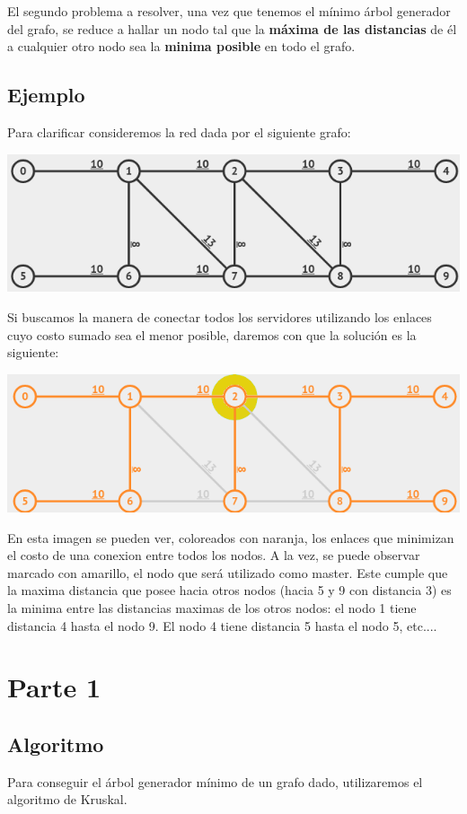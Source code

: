 \documentclass[a4paper]{report}
\begin{document}
El segundo problema a resolver, una vez que tenemos el mínimo árbol generador del grafo, se reduce a hallar un nodo tal que la \textbf{máxima de las distancias} de él a cualquier otro nodo sea la \textbf{minima posible} en todo el grafo.

\subsection{Ejemplo}

Para clarificar consideremos la red dada por el siguiente grafo:

\includegraphics[width=\textwidth]{grafo.png}

Si buscamos la manera de conectar todos los servidores utilizando los enlaces cuyo costo sumado sea el menor posible, daremos con que la solución es la siguiente:

\includegraphics[width=\textwidth]{mst.png}

En esta imagen se pueden ver, coloreados con naranja, los enlaces que minimizan el costo de una conexion entre todos los nodos. 
A la vez, se puede observar marcado con amarillo, el nodo que será utilizado como master.
Este cumple que la maxima distancia que posee hacia otros nodos (hacia 5 y 9 con distancia 3) es la minima entre las distancias maximas de los otros nodos:
el nodo 1 tiene distancia 4 hasta el nodo 9. El nodo 4 tiene distancia 5 hasta el nodo 5, etc....

\section{Parte 1}

\subsection{Algoritmo}
Para conseguir el árbol generador mínimo de un grafo dado, utilizaremos el algoritmo de Kruskal.
\end{document}
